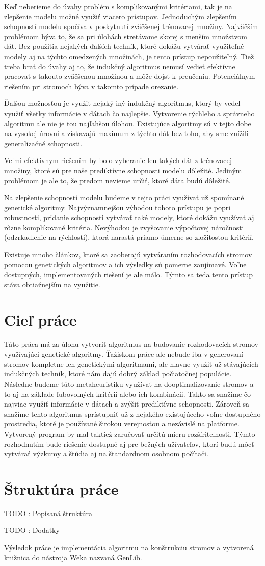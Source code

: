 Keď neberieme do úvahy problém s komplikovanými kritériami, tak je na zlepšenie modelu možné využiť viacero prístupov. Jednoduchým zlepšením schopností modelu spočíva v poskytnutí zväčšenej trénovacej množiny. Najväčším problémom býva to, že sa pri úlohách stretávame skorej s menším množstvom dát. Bez použitia nejakých ďalších techník, ktoré dokážu vytvárať využiteľné modely aj na týchto omedzených množinách, je tento prístup nepoužiteľný. Tiež treba brať do úvahy aj to, že indukčný algoritmus nemusí vedieť efektívne pracovať s takouto zväčšenou množinou a môže dojsť k preučeniu. Potenciálnym riešením pri stromoch býva v takomto prípade orezanie.

Ďalšou možnosťou je využiť nejaký iný indukčný algoritmus, ktorý by vedel využiť všetky informácie v dátach čo najlepšie. Vytvorenie rýchleho a správneho algoritmu ale nie je tou najľahšou úlohou. Existujúce algoritmy sú v tejto dobe na vysokej úrovni a získavajú maximum z týchto dát bez toho, aby sme znížili generalizačné schopnosti.

Veľmi efektívnym riešením by bolo vyberanie len takých dát z trénovacej množiny, ktoré sú pre naše prediktívne schopnosti modelu dôležité. Jediným problémom je ale to, že predom nevieme určiť, ktoré dáta budú dôležité.

Na zlepšenie schopností modelu budeme v tejto práci využívať už spomínané genetické algoritmy. Najvýznamnejšou výhodou tohoto prístupu je popri robustnosti, pridanie schopnosti vytvárať také modely, ktoré dokážu využívať aj rôzne komp\-likované kritéria. Nevýhodou je zvyšovanie výpočtovej náročnosti (odzrkadlenie na rýchlosti), ktorá narastá priamo úmerne so zložitosťou kritérií.

Existuje mnoho článkov, ktoré sa zaoberajú vytváraním rozhodovacích stromov pomocou genetických algoritmov a ich výsledky sú pomerne zaujímavé. Voľne dostupných, implementovaných riešení je ale málo. Týmto sa teda tento prístup stáva obtiažnejším na využitie.
\section{Cieľ práce}
Táto práca má za úlohu vytvoriť algoritmus na budovanie rozhodovacích stromov využívajúci genetické algoritmy. Ťažiskom práce ale nebude iba v generovaní stromov kompletne len genetickými algoritmami, ale hlavne využiť už stávajúcich indukčných techník, ktoré nám dajú dobrý základ počiatočnej populácie. Následne budeme túto metaheuristiku využívať na dooptimalizovanie stromov a to aj na základe ľubovoľných kritérií alebo ich kombinácii. Takto sa snažíme čo najviac využiť informácie v dátach a zvýšiť prediktívne schopnosti. Zároveň sa snažíme tento algoritmus sprístupniť už z nejakého existujúceho voľne dostupného prostredia, ktoré je používané širokou verejnosťou a nezávislé na platforme. Vytvorený program by mal taktiež zaručovať určitú mieru rozšíriteľnosti. Týmto rozhodnutím bude riešenie dostupné aj pre bežných užívateľov, ktorí budú môcť vytvárať výzkumy a štúdia aj na štandardnom osobnom počítači. 

\section{Štruktúra práce}
TODO : Popísaná štruktúra

TODO : Dodatky 

Výsledok práce je implementácia algoritmu na konštrukciu stromov a vytvorená knižnica do nástroja Weka nazvaná GenLib.